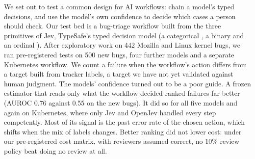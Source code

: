 We set out to test a common design for AI workflows: chain a model's
typed decisions, and use the model's own confidence to decide which cases
a person should check. Our test bed is a bug-triage workflow built from
the three primitives of Jev, TypeSafe's typed decision model (a
categorical \choice{}, a binary \noul{} and an ordinal \score{}). After
exploratory work on 442 Mozilla and Linux kernel bugs, we ran
pre-registered tests on 500 new bugs, four further models and a separate
Kubernetes workflow. We count a failure when the workflow's action
differs from a target built from tracker labels, a target we have not yet
validated against human judgment. The models' confidence turned out to be
a poor guide. A frozen estimator that reads only what the workflow decided
ranked failures far better (AUROC 0.76 against 0.55 on the new bugs).
It did so for all five models and again on Kubernetes, where only Jev
and OpenJev handled every step competently. Most of its signal is the past error rate
of the chosen action, which shifts when the mix of labels changes. Better
ranking did not lower cost: under our pre-registered cost matrix, with
reviewers assumed correct, no 10\% review policy beat doing no review at
all.
